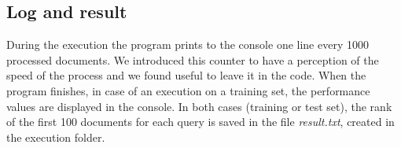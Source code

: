 \documentclass[a4paper, 11pt]{article}
\begin{document}
\subsection{Log and result}
During the execution the program prints to the console one line every 1000 processed documents. We introduced this counter to have a perception of the speed of the process and we found useful to leave it in the code. When the program finishes, in case of an execution on a training set, the performance values are displayed in the console. In both cases (training or test set), the rank of the first 100 documents for each query is saved in the file \textit{result.txt}, created in the execution folder.
\end{document}
